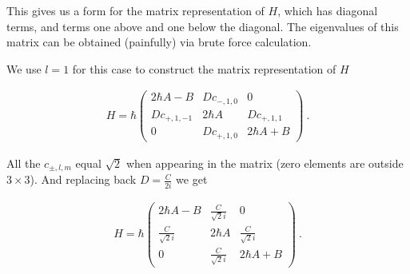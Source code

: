 This gives us a form for the matrix representation of $H$, which has diagonal
terms, and terms one above and one below the diagonal. The eigenvalues of this
matrix can be obtained (painfully) via brute force calculation.

We use $l = 1$ for this case to construct the matrix representation of $H$

\begin{align}
    H = \hbar \begin{pmatrix}
        2\hbar A - B    & Dc_{-, 1,0}       & 0             \\   
        Dc_{+, 1,-1}    & 2\hbar A          & Dc_{+, 1,1}   \\   
        0               & Dc_{+, 1,0}       & 2\hbar A + B    
    \end{pmatrix}~.
\end{align}

All the $c_{\pm, l,m}$ equal $\sqrt{2}$ when appearing in the matrix (zero
elements are outside $3\times 3$). And replacing back $D = \frac{C}{2i}$ we get

\begin{align}
    H = \hbar \begin{pmatrix}
        2\hbar A - B        & \frac{C}{\sqrt{2}i}       & 0                     \\   
        \frac{C}{\sqrt{2}i} & 2\hbar A                  & \frac{C}{\sqrt{2}i}   \\   
        0                   & \frac{C}{\sqrt{2}i}       & 2\hbar A + B    
    \end{pmatrix}~.
\end{align}
